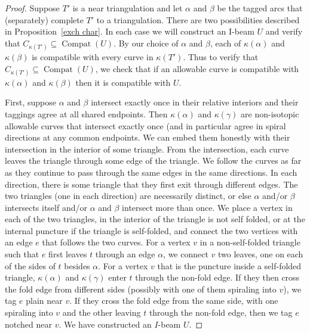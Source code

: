 \documentclass{amsart}
\theoremstyle{definition}
\theoremstyle{remark}
\numberwithin{equation}{section}
\newcommand{\0}{{\mathbf{0}}}
\newcommand{\Compat}{\operatorname{Compat}}
\begin{document}
\begin{proof}
Suppose $T'$ is a near triangulation and let $\alpha$ and $\beta$ be the tagged arcs that (separately) complete $T'$ to a triangulation.
There are two possibilities described in Proposition~\ref{exch char}.
In each case we will construct an I-beam $U$ and verify that $C_{\kappa(T')}\subseteq\Compat(U)$.
By our choice of $\alpha$ and $\beta$, each of $\kappa(\alpha)$ and $\kappa(\beta)$ is compatible with every curve in $\kappa(T')$.
Thus to verify that $C_{\kappa(T')}\subseteq\Compat(U)$, we check that if an allowable curve is compatible with $\kappa(\alpha)$ and $\kappa(\beta)$ then it is compatible with $U$.

First, suppose $\alpha$ and $\beta$ intersect exactly once in their relative interiors and their taggings agree at all shared endpoints.
Then $\kappa(\alpha)$ and $\kappa(\gamma)$ are non-isotopic allowable curves that intersect exactly once (and in particular agree in spiral directions at any common endpoints.
We can embed them honestly with their intersection in the interior of some triangle.
From the intersection, each curve leaves the triangle through some edge of the triangle.
We follow the curves as far as they continue to pass through the same edges in the same directions.
In each direction, there is some triangle that they first exit through different edges.
The two triangles (one in each direction) are necessarily distinct, or else $\alpha$ and/or $\beta$ intersects itself and/or $\alpha$ and $\beta$ intersect more than once.
We place a vertex in each of the two triangles, in the interior of the triangle is not self folded, or at the internal puncture if the triangle is self-folded, and connect the two vertices with an edge $e$ that follows the two curves.
For a vertex $v$ in a non-self-folded triangle such that $e$ first leaves $t$ through an edge $\alpha$, we connect $v$ two leaves, one on each of the sides of $t$ besides $\alpha$.
For a vertex $v$ that is the puncture inside a self-folded triangle, $\kappa(\alpha)$ and $\kappa(\gamma)$ enter $t$ through the non-fold edge.
If they then cross the fold edge from different sides (possibly with one of them spiraling into $v$), we tag $e$ plain near $v$.
If they cross the fold edge from the same side, with one spiraling into $v$ and the other leaving $t$ through the non-fold edge, then we tag $e$ notched near $v$.
We have constructed an $I$-beam $U$.


\end{proof}
\end{document}
